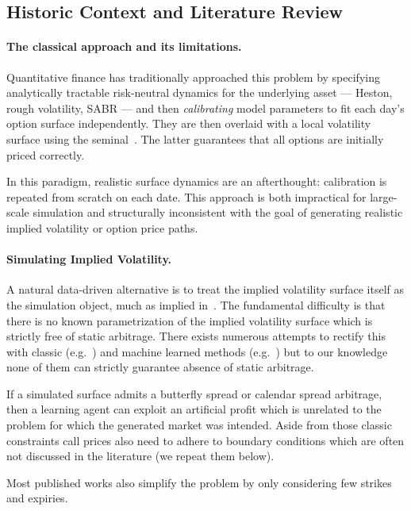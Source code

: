 \documentclass[11pt,a4paper]{article}
\begin{document}
\subsection*{Historic Context and Literature Review}

\paragraph{The classical approach and its limitations.}
Quantitative finance has traditionally approached this problem by specifying
analytically tractable risk-neutral dynamics for the underlying asset ---
Heston, rough volatility, SABR --- and then \emph{calibrating} model parameters
to fit each day's option surface independently. They are then overlaid with 
a local volatility surface using the seminal~\cite{Guyon2011TheSC}. The latter
guarantees that all options are initially priced correctly.

In this paradigm, realistic surface dynamics are an afterthought: calibration is repeated
from scratch on each date. 
This approach is both impractical for large-scale simulation and structurally inconsistent
with the goal of generating realistic implied volatility or option price
paths.

\paragraph{Simulating Implied Volatility.}
A natural data-driven alternative is to treat the implied volatility surface itself
as the simulation object, much as implied in~\cite{ContVol}.
The fundamental difficulty is that there is no known parametrization  of
the implied volatility surface which is strictly free of static
arbitrage. There exists numerous attempts to rectify this with classic (e.g.~\cite{fengler2009}) and machine learned
methods (e.g.~\cite{vae_ning2023arbitrage}) but to our knowledge none of them can strictly guarantee absence of static arbitrage.

If a simulated surface admits a butterfly spread or calendar spread arbitrage,
then a learning agent can exploit an artificial profit which is unrelated to the
problem for which the generated market was intended. Aside from those classic constraints
call prices also need to adhere to boundary conditions which are often not discussed
in the literature (we repeat them below).

Most published works also simplify the problem by only considering few strikes and expiries.
\end{document}
